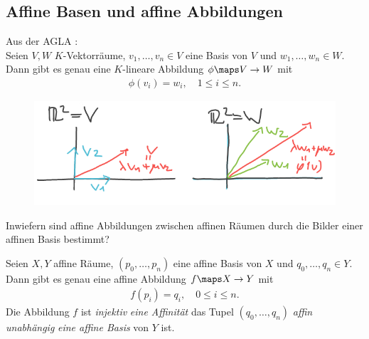 \subsection*{Affine Basen und affine Abbildungen}
Aus der AGLA :\\
Seien \( V,W \) \( K \)-Vektorräume, \( v_1,\dotsc, v_n \in V \) eine Basis von \( V \) und \( w_1,\dotsc, w_n \in W\). Dann gibt es genau eine \( K \)-lineare Abbildung \( \phi\maps V\to W \) mit
\begin{align*}
    \phi(v_i)=w_i,\quad 1\leq i \leq n.
\end{align*}
\begin{figure}[H]
    \centering
    \includegraphics[width=0.7\linewidth]{figures/bilder_der_basen_bestimmt_abbildung_r_2}
    \label{fig:bilder_der_basen_bestimmt_abbildung_r_2}
\end{figure}
\begin{frage*}
    Inwiefern sind affine Abbildungen zwischen affinen Räumen durch die Bilder einer affinen Basis bestimmt?
\end{frage*}
\begin{satz}\label{bilder_der_basen_bestimmen_affine_abbildung}
    Seien \( X,Y \) affine Räume, \( (p_0,\dotsc,p_n) \) eine affine Basis von \( X \) und \( q_0,\dotsc, q_n\in Y \). Dann gibt es genau eine affine Abbildung \( f\maps X\to Y \) mit
    \begin{align*}
        f(p_i)=q_i,\quad 0\leq i\leq n.
    \end{align*}
    Die Abbildung \( f \) ist \emph{injektiv} \bzw \emph{eine Affinität} \gdw das Tupel \( (q_0,\dotsc, q_n) \) \emph{affin unabhängig} \bzw \emph{eine affine Basis} von \( Y \) ist.
\end{satz}

